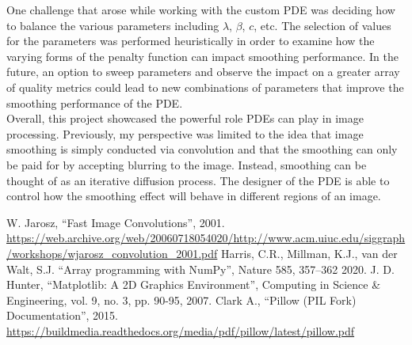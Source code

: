 \documentclass{article}
\begin{document}
  \noindent
  One challenge that arose while working with the custom PDE was deciding
  how to balance the various parameters including $\lambda$, $\beta$,
  $c$, etc. The selection of values for the parameters was performed
  heuristically in order to examine how the varying forms of the
  penalty function can impact smoothing performance. In the future,
  an option to sweep parameters and observe the impact
  on a greater array of quality metrics could lead to
  new combinations of parameters that improve the smoothing
  performance of the PDE.\\

  \noindent
  Overall, this project showcased the powerful role PDEs can
  play in image processing. Previously, my perspective was limited
  to the idea that image smoothing is simply conducted via convolution
  and that the smoothing can only be paid for by accepting
  blurring to the image. Instead, smoothing can be thought of 
  as an iterative diffusion process. The designer of the
  PDE is able to control how the smoothing effect will
  behave in different regions of an image.


  \newpage
  \begin{thebibliography}{999}

    W. Jarosz, ``Fast Image Convolutions'', 2001.
    \url{https://web.archive.org/web/20060718054020/http://www.acm.uiuc.edu/siggraph/workshops/wjarosz_convolution_2001.pdf}
    Harris, C.R., Millman, K.J., van der Walt, S.J. ``Array programming with NumPy'', Nature 585, 357–362 2020.
    J. D. Hunter, ``Matplotlib: A 2D Graphics Environment'', Computing in Science \& Engineering, vol. 9, no. 3, pp. 90-95, 2007.
    Clark A., ``Pillow (PIL Fork) Documentation'', 2015. \url{https://buildmedia.readthedocs.org/media/pdf/pillow/latest/pillow.pdf}
  \end{thebibliography}
\end{document}
